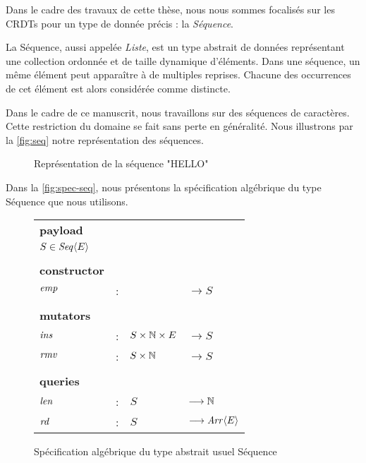 \label{sec:seq-crdts}

Dans le cadre des travaux de cette thèse, nous nous sommes focalisés sur les \acp{CRDT} pour un type de donnée précis : la \emph{Séquence}.

La Séquence, aussi appelée \emph{Liste}, est un type abstrait de données représentant une collection ordonnée et de taille dynamique d'éléments.
Dans une séquence, un même élément peut apparaître à de multiples reprises.
Chacune des occurrences de cet élément est alors considérée comme distincte.

Dans le cadre de ce manuscrit, nous travaillons sur des séquences de caractères.
Cette restriction du domaine se fait sans perte en généralité.
Nous illustrons par la \autoref{fig:seq} notre représentation des séquences.

\begin{figure}[!ht]

  \centering
  \caption{Représentation de la séquence "HELLO"}
  \label{fig:seq}
\end{figure}

Dans la \autoref{fig:spec-seq}, nous présentons la spécification algébrique du type Séquence que nous utilisons.

\begin{figure}[!ht]

  \centering
    \begin{tabular}{llll}
      \textbf{payload} \\
      $S \in \mathit{Seq}\langle E \rangle$ & & & \\
      \\
      \textbf{constructor} \\
      $\mathit{emp}$ & : &                       & $\longrightarrow S$   \\
      \\
      \textbf{mutators} \\
      $\mathit{ins}$ & : & $S \times \mathbb{N} \times E$ & $\longrightarrow S$   \\
      $\mathit{rmv}$ & : & $S \times \mathbb{N}$          & $\longrightarrow S$   \\
      \\
      \textbf{queries} \\
      $\mathit{len}$ & : & $S$                   & $\longrightarrow \mathbb{N}$   \\
      $\mathit{rd}$  & : & $S$                   & $\longrightarrow \mathit{Arr}\langle E \rangle$ \\
    \end{tabular}
  \caption{Spécification algébrique du type abstrait usuel Séquence}
  \label{fig:spec-seq}
\end{figure}

